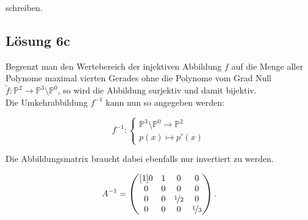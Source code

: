\documentclass[main.tex]{subfiles}
\begin{document}
schreiben.

\subsection{Lösung 6c}

Begrenzt man den Wertebereich der injektiven Abbildung $f$ auf die Menge aller Polynome
maximal vierten Gerades ohne die Polynome vom Grad Null
$\tilde{f}:\mathbb{P}^2 \to \mathbb{P}^3\setminus \mathbb{P}^0$,
so wird die Abbildung surjektiv und damit bijektiv.\\

Die Umkehrabbildung $f^{-1}$ kann nun so angegeben werden:

$$
    f^{-1} : \begin{cases}
        \mathbb{P}^3 \setminus \mathbb{P}^0 \to \mathbb{P}^2\\
        p(x) \mapsto p'(x)
    \end{cases}
$$

Die Abbildungsmatrix braucht dabei ebenfalls nur invertiert zu werden.

$$
    A^{-1} = \begin{pmatrix}[1]
        0 & 1 & 0 & 0 \\
        0 & 0 & 0 & 0 \\
        0 & 0 & \nicefrac{1}{2} & 0 \\
        0 & 0 & 0& \nicefrac{1}{3}
    \end{pmatrix}.
$$
\end{document}
